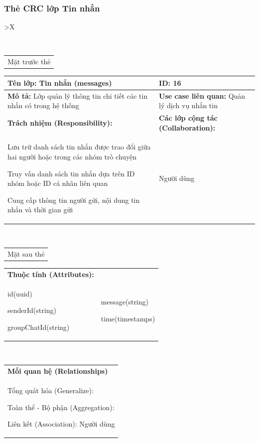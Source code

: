 \cleardoublepage

\subsubsection{Thẻ CRC lớp Tin nhắn}

\begin{xltabular}{\textwidth}{
		>{\centering\arraybackslash}X
	}
	\caption{\bfseries \fontsize{12pt}{0pt}\selectfont Thẻ CRC lớp Tin nhắn}
	\\
	\begin{tabularx}{0.9\textwidth}{X}
		Mặt trước thẻ
	\end{tabularx}
	\begin{tabularx}{0.9\textwidth}{|X|X|}
		\hline
		\textbf{Tên lớp:} Tin nhắn (messages)                                         & \textbf{ID:} 16                                        \\
		\hline
		\textbf{Mô tả:} Lớp quản lý thông tin chi tiết các tin nhắn có trong hệ thống & \textbf{Use case liên quan:}  Quản lý dịch vụ nhắn tin \\
		\hline
		\textbf{Trách nhiệm (Responsibility):}                                        & \textbf{Các lớp cộng tác (Collaboration):}             \\
		Lưu trữ danh sách tin nhắn được trao đổi giữa hai người hoặc trong các nhóm trò chuyện

		Truy vấn danh sách tin nhắn dựa trên ID nhóm hoặc ID cá nhân liên quan

		Cung cấp thông tin người gửi, nội dung tin nhắn và thời gian gửi
		                                                                              &
		Người dùng
		\\
		\hline
	\end{tabularx}
	\\
	\begin{tabularx}{0.9\textwidth}{X}
		Mặt sau thẻ
	\end{tabularx}
	\begin{tabularx}{0.9\textwidth}{|X|X|}
		\hline
		\textbf{Thuộc tính (Attributes):} & \\
		id(uuid)

		senderId(string)

		groupChatId(string)
		                                  &
		message(string)

		time(timestamps)
		\\ \hline
	\end{tabularx}
	\\
	\begin{tabularx}{0.9\textwidth}{|X|}
		\hline
		\textbf{Mối quan hệ (Relationships)} \\
		Tổng quát hóa (Generalize):

		Toàn thể - Bộ phận (Aggregation):

		Liên kết (Association): Người dùng
		\\
		\hline
	\end{tabularx}
\end{xltabular}

